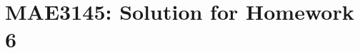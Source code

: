 \documentclass[10pt]{article}
\date{}
\theoremstyle{plain}\theorembodyfont{\normalfont}
\newtheorem{prob}{Problem}[section]
\newenvironment{subprob}%
{\renewcommand{\theenumi}{\alph{enumi}}\renewcommand{\labelenumi}{(\theenumi)}\begin{enumerate}}%
{\end{enumerate}}%
\begin{document}
\pagestyle{empty}
\section*{MAE3145: Solution for Homework 6}

%
%
\end{document}
